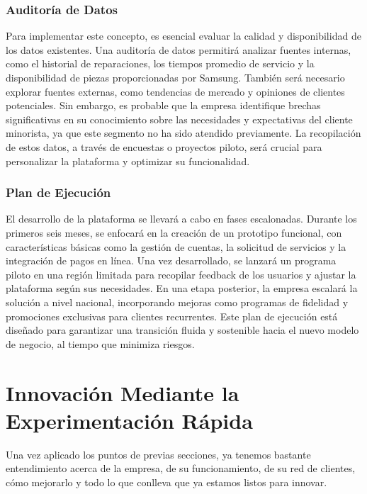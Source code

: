 \subsubsection{Auditoría de Datos}

Para implementar este concepto, es esencial evaluar la calidad y disponibilidad de
los datos existentes. Una auditoría de datos permitirá analizar fuentes internas,
como el historial de reparaciones, los tiempos promedio de servicio y la
disponibilidad de piezas proporcionadas por Samsung. También será necesario explorar
fuentes externas, como tendencias de mercado y opiniones de clientes potenciales.
Sin embargo, es probable que la empresa identifique brechas significativas en su
conocimiento sobre las necesidades y expectativas del cliente minorista, ya que este
segmento no ha sido atendido previamente. La recopilación de estos datos, a través
de encuestas o proyectos piloto, será crucial para personalizar la plataforma y
optimizar su funcionalidad.

\subsubsection{Plan de Ejecución}

El desarrollo de la plataforma se llevará a cabo en fases escalonadas. Durante
los primeros seis meses, se enfocará en la creación de un prototipo funcional,
con características básicas como la gestión de cuentas, la solicitud de servicios
y la integración de pagos en línea. Una vez desarrollado, se lanzará un programa
piloto en una región limitada para recopilar feedback de los usuarios y ajustar la
plataforma según sus necesidades. En una etapa posterior, la empresa escalará la
solución a nivel nacional, incorporando mejoras como programas de fidelidad y
promociones exclusivas para clientes recurrentes. Este plan de ejecución está diseñado
para garantizar una transición fluida y sostenible hacia el nuevo modelo de negocio,
al tiempo que minimiza riesgos.

\clearpage


\clearpage
\section{Innovación Mediante la Experimentación Rápida}

Una vez aplicado los puntos de previas secciones, ya tenemos bastante
entendimiento acerca de la empresa, de su funcionamiento, de su red de clientes,
cómo mejorarlo y todo lo que conlleva que ya estamos listos para innovar.

